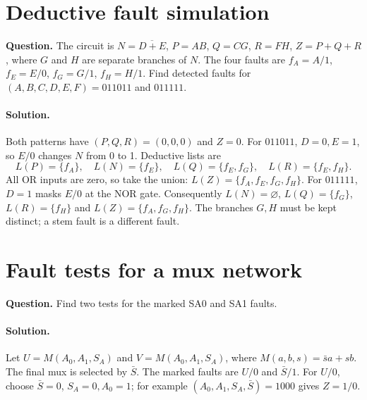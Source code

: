 \documentclass[11pt]{article}
\newcommand{\sol}{\paragraph{Solution.}}
\begin{document}
\section{Deductive fault simulation}
\textbf{Question.} The circuit is
$N=\overline{D+E}$, $P=AB$, $Q=CG$, $R=FH$, $Z=P+Q+R$,
where $G$ and $H$ are separate branches of $N$.
The four faults are $f_A=A/1$, $f_E=E/0$, $f_G=G/1$, $f_H=H/1$.
Find detected faults for $(A,B,C,D,E,F)=011011$ and $011111$.
\begin{center}\end{center}

\sol Both patterns have $(P,Q,R)=(0,0,0)$ and $Z=0$.
For $011011$, $D=0,E=1$, so $E/0$ changes $N$ from 0 to 1.
Deductive lists are
\[
L(P)=\{f_A\},\quad L(N)=\{f_E\},\quad
L(Q)=\{f_E,f_G\},\quad L(R)=\{f_E,f_H\}.
\]
All OR inputs are zero, so take the union:
$L(Z)=\{f_A,f_E,f_G,f_H\}$.
For $011111$, $D=1$ masks $E/0$ at the NOR gate.
Consequently $L(N)=\varnothing$, $L(Q)=\{f_G\}$,
$L(R)=\{f_H\}$ and $L(Z)=\{f_A,f_G,f_H\}$.
The branches $G,H$ must be kept distinct; a stem fault is a different fault.
\section{Fault tests for a mux network}
\textbf{Question.} Find two tests for the marked SA0 and SA1 faults.
\begin{center}\end{center}
\sol Let $U=M(A_0,A_1,S_A)$ and $V=M(A_0,A_1,S_A)$,
where $M(a,b,s)=\bar s a+sb$. The final mux is selected by $\bar S$.
The marked faults are $U/0$ and $\bar S/1$.
For $U/0$, choose $\bar S=0$, $S_A=0,A_0=1$;
for example $(A_0,A_1,S_A,\bar S)=1000$ gives $Z=1/0$.
\end{document}
